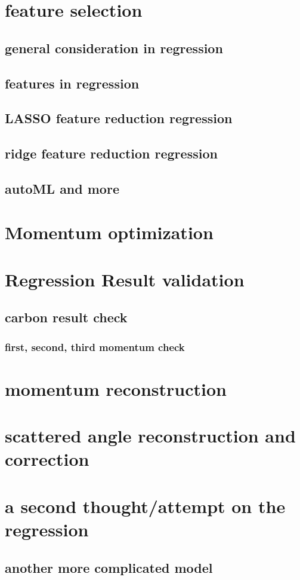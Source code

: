 \section{feature selection}

\subsection{general consideration in regression}

\subsection{features in regression}

\subsection{LASSO feature reduction regression}

\subsection{ridge feature reduction regression}

\subsection{autoML and more}

\section{Momentum optimization}

\section{Regression Result validation}

\subsection{carbon result check}

\subsubsection{first, second, third momentum check}

\section{momentum reconstruction}

\section{scattered angle reconstruction and correction}

\section{a second thought/attempt on the regression}

\subsection{another more complicated model}